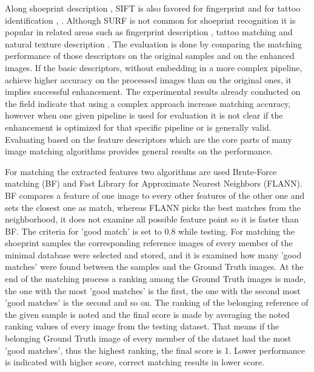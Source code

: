 \documentclass[draft,final]{vutinfth} %
\begin{document}
Along shoeprint description \cite{nibouche2009rotation}, \cite{richetelli2017classification} SIFT is also favored for fingerprint \cite{zhou2011adaptive} and for tattoo identification \cite{yi2015impact}, \cite{han2013tattoo}.
Although SURF is not common for shoeprint recognition it is popular in related areas such as fingerprint description \cite{jahan2017robust}, tattoo matching \cite{yi2015impact} and natural texture description \cite{prabhakar2012lbp}.
The evaluation is done by comparing the matching performance of those descriptors on the original samples and on the enhanced images.
If the basic descriptors, without embedding in a more complex pipeline, achieve higher accuracy on the processed  images than on the original ones, it implies successful enhancement.
The experimental results already conducted on the field indicate \cite{rida2019forensic} that using a complex approach increase matching accuracy, however when one given pipeline is used for evaluation it is not clear if the enhancement is optimized for that specific pipeline or is generally valid.
Evaluating based on the feature descriptors which are the core parts of many image matching algorithms provides general results on the performance.
\par
For matching the extracted features two algorithms are used Brute-Force matching (BF) and Fast Library for Approximate Nearest Neighbors (FLANN).
BF compares a feature of one image to every other features of the other one and sets the closest one as match, whereas FLANN picks the best matches from the neighborhood, it does not examine all possible feature point so it is faster than BF.
The criteria for 'good match' is set to 0.8 while testing.
For matching the shoeprint samples the corresponding reference images of every member of the minimal database were selected and stored, and it is examined how many 'good matches' were found between the samples and the Ground Truth images.
At the end of the matching process a ranking among the Ground Truth images is made, the one with the most 'good matches' is the first, the one with the second most 'good matches' is the second and so on.
The ranking of the belonging reference of the given sample is noted and the final score is made by averaging the noted ranking values  of every image from the testing dataset.
That means if the belonging Ground Truth image of every member of the dataset had the most 'good matches', thus the highest ranking, the final score is 1.
Lower performance is indicated with higher score, correct matching results in lower score.
\par
\end{document}
